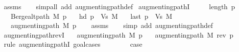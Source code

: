 \begin{isabellebody}
\ assms\isanewline
\ \ \isamarkupfalse%
\ {\isacharparenleft}{\kern0pt}simp{\isacharunderscore}{\kern0pt}all\ add{\isacharcolon}{\kern0pt}\ augmenting{\isacharunderscore}{\kern0pt}path{\isacharunderscore}{\kern0pt}def{\isacharparenright}{\kern0pt}%
\endisatagproof
{\isafoldproof}%
%
\isadelimproof
%
\endisadelimproof
\isanewline
%
\isadeliminvisible
\isanewline
%
\endisadeliminvisible
%
\isataginvisible
{}\isamarkupfalse%
\ augmenting{\isacharunderscore}{\kern0pt}pathI{\isacharcolon}{\kern0pt}\isanewline
\ \ \ {\isachardoublequoteopen}{}\ {\isasymle}\ length\ p{\isachardoublequoteclose}\isanewline
\ \ \ {\isachardoublequoteopen}Berge{\isachardot}{\kern0pt}alt{\isacharunderscore}{\kern0pt}path\ M\ p{\isachardoublequoteclose}\isanewline
\ \ \ {\isachardoublequoteopen}hd\ p\ {\isasymnotin}\ Vs\ M{\isachardoublequoteclose}\isanewline
\ \ \ {\isachardoublequoteopen}last\ p\ {\isasymnotin}\ Vs\ M{\isachardoublequoteclose}\isanewline
\ \ \ {\isachardoublequoteopen}augmenting{\isacharunderscore}{\kern0pt}path\ M\ p{\isachardoublequoteclose}%
\endisataginvisible
{\isafoldinvisible}%
%
\isadeliminvisible
%
\endisadeliminvisible
\isanewline
%
\isadelimproof
\ \ %
\endisadelimproof
%
\isatagproof
{}\isamarkupfalse%
\ assms\isanewline
\ \ \isamarkupfalse%
\ {\isacharparenleft}{\kern0pt}simp\ add{\isacharcolon}{\kern0pt}\ augmenting{\isacharunderscore}{\kern0pt}path{\isacharunderscore}{\kern0pt}def{\isacharparenright}{\kern0pt}%
\endisatagproof
{\isafoldproof}%
%
\isadelimproof
%
\endisadelimproof
\isanewline
\isanewline
{}\isamarkupfalse%
\ augmenting{\isacharunderscore}{\kern0pt}path{\isacharunderscore}{\kern0pt}revI{\isacharcolon}{\kern0pt}\isanewline
\ \ \ {\isachardoublequoteopen}augmenting{\isacharunderscore}{\kern0pt}path\ M\ p{\isachardoublequoteclose}\isanewline
\ \ \ {\isachardoublequoteopen}augmenting{\isacharunderscore}{\kern0pt}path\ M\ {\isacharparenleft}{\kern0pt}rev\ p{\isacharparenright}{\kern0pt}{\isachardoublequoteclose}\isanewline
%
\isadelimproof
%
\endisadelimproof
%
\isatagproof
{}\isamarkupfalse%
\ {\isacharparenleft}{\kern0pt}rule\ augmenting{\isacharunderscore}{\kern0pt}pathI{\isacharcomma}{\kern0pt}\ goal{\isacharunderscore}{\kern0pt}cases{\isacharparenright}{\kern0pt}\isanewline
\ \ \isamarkupfalse%
\ {}\isanewline
\ \ \isamarkupfalse%
\ {\isacharquery}{\kern0pt}case\isanewline

\end{isabellebody}
